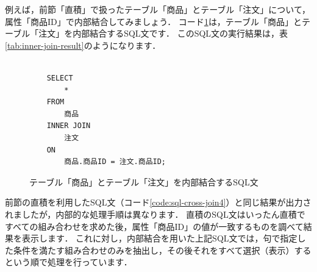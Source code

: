 例えば，前節「直積」で扱ったテーブル「商品」とテーブル「注文」について，属性「商品ID」で内部結合してみましょう．
コード\ref{code:inner-join}は，テーブル「商品」とテーブル「注文」を内部結合するSQL文です．
このSQL文の実行結果は，表\ref{tab:inner-join-result}のようになります．
\begin{figure}[!htbp]
    \begin{verbatim}

    SELECT
        *
    FROM
        商品
    INNER JOIN
        注文
    ON
        商品.商品ID = 注文.商品ID;

    \end{verbatim}
    \captionsetup{name=コード}
    \caption{テーブル「商品」とテーブル「注文」を内部結合するSQL文}
    \label{code:inner-join}
\end{figure}
\begin{table}[!htbp]
    \centering
    \caption{テーブル「商品」とテーブル「注文」を内部結合するSQL文の実行結果}
    \label{tab:inner-join-result}
\end{table}

前節の直積を利用したSQL文（コード\ref{code:sql-cross-join4}）と同じ結果が出力されましたが，内部的な処理手順は異なります．
直積のSQL文はいったん直積ですべての組み合わせを求めた後，属性「商品ID」の値が一致するものを調べて結果を表示します．
これに対し，内部結合を用いた上記SQL文では，句で指定した条件を満たす組み合わせのみを抽出し，その後それをすべて選択（表示）するという順で処理を行っています．

